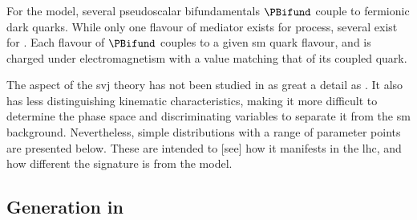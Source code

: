 





\subsubsection{\texorpdfstring{\tchannel}{t-channel}}
\label{subsubsec:svj_signal_madgraph_tchannel}

For the \tchannel model, several pseudoscalar bifundamentals $\PBifund$ couple to fermionic dark quarks. While only one flavour of mediator exists for \schannel process, several exist for \tchannel. Each flavour of $\PBifund$ couples to a given \acrshort{sm} quark flavour, and is charged under electromagnetism with a value matching that of its coupled quark.


The \tchannel aspect of the \gls{svj} theory has not been studied in as great a detail as \schannel. It also has less distinguishing kinematic characteristics, making it more difficult to determine the phase space and discriminating variables to separate it from the \acrlong{sm} background. Nevertheless, simple distributions with a range of parameter points are presented below. These are intended to [see] how it manifests in the \acrshort{lhc}, and how different the signature is from the \schannel model.





\subsection{Generation in \texorpdfstring{\PYTHIA}{Pythia}}
\label{subsec:svj_signal_pythia}

